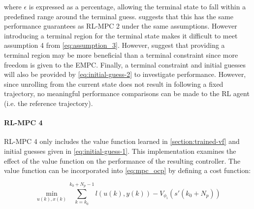 where $\epsilon$ is expressed as a percentage, allowing the terminal state to fall within a predefined range around the terminal guess. \cite{amritEconomicOptimizationUsing2011} suggests that this has the same performance guarantees as RL-MPC 2 under the same assumptions. However introducing a terminal region for the terminal state makes it difficult to meet assumption 4 from \autoref{eq:assumption_3}. However, \cite{amritEconomicOptimizationUsing2011} suggest that providing a terminal region may be more beneficial than a terminal constraint since more freedom is given to the EMPC. Finally, a terminal constraint and initial guesses will also be provided by \autoref{eq:initial-guess-2} to investigate performance. However, since unrolling from the current state does not result in following a fixed trajectory, no meaningful performance comparisons can be made to the RL agent (i.e. the reference trajectory).

\paragraph{RL-MPC 4}
RL-MPC 4 only includes the value function learned in \autoref{section:trained-vf} and initial guesses given in \autoref{eq:initial-guess-1}. This implementation examines the effect of the value function on the performance of the resulting controller. The value function can be incorporated into \autoref{eq:mpc_ocp} by defining a cost function:

\begin{equation}\label{eq:cost-function}
		\min_{u(k),x(k)}  \sum_{k = k_0}^{k_0 + N_p - 1}{l(u(k), y(k))} - V_{\phi_i}(s'(k_0 + N_p))
\end{equation}

